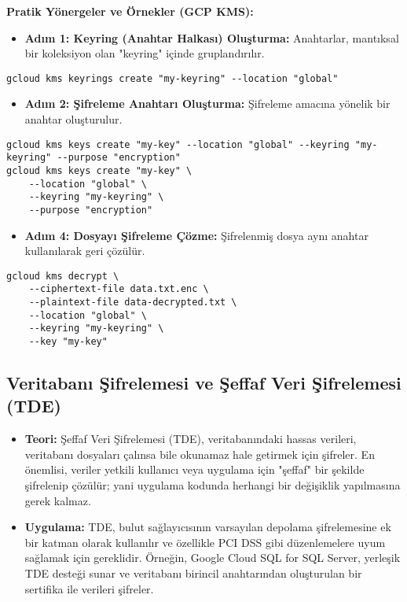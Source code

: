 \textbf{Pratik Yönergeler ve Örnekler (GCP KMS):}
\begin{itemize}
    \item \textbf{Adım 1: Keyring (Anahtar Halkası) Oluşturma:} Anahtarlar, mantıksal bir koleksiyon olan "keyring" içinde gruplandırılır.
\end{itemize}

\begin{lstlisting}[breaklines=true,basicstyle=\ttfamily\footnotesize]
gcloud kms keyrings create "my-keyring" --location "global"
\end{lstlisting}

\begin{itemize}
    \item \textbf{Adım 2: Şifreleme Anahtarı Oluşturma:} Şifreleme amacına yönelik bir anahtar oluşturulur.
\end{itemize}

\begin{lstlisting}[breaklines=true,basicstyle=\ttfamily\footnotesize]
gcloud kms keys create "my-key" --location "global" --keyring "my-keyring" --purpose "encryption"
gcloud kms keys create "my-key" \
    --location "global" \
    --keyring "my-keyring" \
    --purpose "encryption"
\end{lstlisting}

\begin{itemize}
    \item \textbf{Adım 4: Dosyayı Şifreleme Çözme:} Şifrelenmiş dosya aynı anahtar kullanılarak geri çözülür.
\end{itemize}

\begin{lstlisting}[breaklines=true,basicstyle=\ttfamily\footnotesize]
gcloud kms decrypt \
    --ciphertext-file data.txt.enc \
    --plaintext-file data-decrypted.txt \
    --location "global" \
    --keyring "my-keyring" \
    --key "my-key"
\end{lstlisting}

\subsection{Veritabanı Şifrelemesi ve Şeffaf Veri Şifrelemesi (TDE)}
\begin{itemize}
    \item \textbf{Teori:} Şeffaf Veri Şifrelemesi (TDE), veritabanındaki hassas verileri, veritabanı dosyaları çalınsa bile okunamaz hale getirmek için şifreler. En önemlisi, veriler yetkili kullanıcı veya uygulama için "şeffaf" bir şekilde şifrelenip çözülür; yani uygulama kodunda herhangi bir değişiklik yapılmasına gerek kalmaz.
    \item \textbf{Uygulama:} TDE, bulut sağlayıcısının varsayılan depolama şifrelemesine ek bir katman olarak kullanılır ve özellikle PCI DSS gibi düzenlemelere uyum sağlamak için gereklidir. Örneğin, Google Cloud SQL for SQL Server, yerleşik TDE desteği sunar ve veritabanı birincil anahtarından oluşturulan bir sertifika ile verileri şifreler.
\end{itemize}


